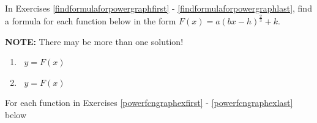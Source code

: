 \documentclass{ximera}
\begin{document}
In Exercises \ref{findformulaforpowergraphfirst} - \ref{findformulaforpowergraphlast}, find a formula for each function below in the form $F(x) = a(bx-h)^{\frac{2}{3}}+k$.

\smallskip

\textbf{NOTE:}  There may be more than one solution!

\begin{multicols}{2}

\begin{enumerate}
\setcounter{enumi}{\value{HW}}

\item $~$ \label{findformulaforpowergraphfirst}  $y=F(x)$ %



 



\item $~$ \label{findformulaforpowergraphlast} $y = F(x)$ %



 

\setcounter{HW}{\value{enumi}}

\end{enumerate}

\end{multicols}
\newpage

For each function in Exercises \ref{powerfcngraphexfirst} - \ref{powerfcngraphexlast} below 
\end{document}
